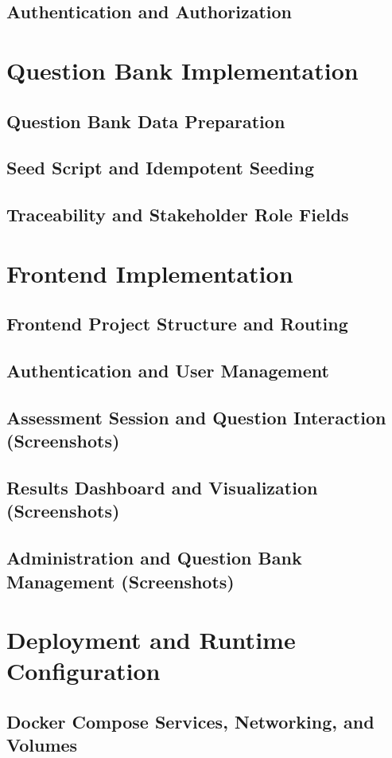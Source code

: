 \documentclass[a4paper, 12pt, oneside, openany, BCOR1cm,toc=chapterentrywithdots]{scrbook}
\begin{document}
\subsection{Authentication and Authorization}
\section{Question Bank Implementation}
\subsection{Question Bank Data Preparation}
\subsection{Seed Script and Idempotent Seeding}
\subsection{Traceability and Stakeholder Role Fields}
\section{Frontend Implementation}
\subsection{Frontend Project Structure and Routing}
\subsection{Authentication and User Management}
\subsection{Assessment Session and Question Interaction (Screenshots)}
\subsection{Results Dashboard and Visualization (Screenshots)}
\subsection{Administration and Question Bank Management (Screenshots)}
\section{Deployment and Runtime Configuration}
\subsection{Docker Compose Services, Networking, and Volumes}
\end{document}
